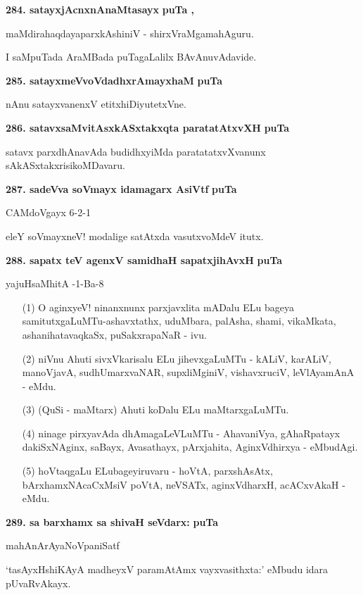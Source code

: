 \medskip
\noindent
\textbf{284. satayxjAcnxnAnaMtasayx} \hfill{\bf puTa \pageref{81}, \pageref{103}}

\hfill{maMdirahaqdayaparxkAshiniV - shirxVraMgamahAguru.}

\smallskip
I saMpuTada AraMBada puTagaLalilx BAvAnuvAdavide.

\medskip
\noindent
\textbf{285. satayxmeVvoVdadhxrAmayxhaM} \hfill{\bf puTa \pageref{92}}

\smallskip
nAnu satayxvanenxV etitxhiDiyutetxVne.

\medskip
\noindent
\textbf{286. satavxsaMvitAsxkASxtakxqta paratatAtxvXH} \hfill{\bf puTa \pageref{48}}

\smallskip
satavx parxdhAnavAda budidhxyiMda paratatatxvXvanunx sAkASxtakxrisikoMDavaru.

\medskip
\noindent
\textbf{287. sadeVva soVmayx idamagarx AsiVtf} \hfill{\bf puTa \pageref{74}}

\hfill{CAMdoVgayx 6-2-1}

\smallskip
eleY soVmayxneV! modalige satAtxda vasutxvoMdeV itutx.

\medskip
\noindent
\textbf{288. sapatx teV agenxV samidhaH sapatxjihAvxH} \hfill{\bf puTa \pageref{210}}

\hfill{yajuHsaMhitA -1-Ba-8}

\begin{itemize}
\item[(1)] O aginxyeV! ninanxnunx parxjavxlita mADalu ELu bageya samitutxgaLuMTu-\break ashavxtathx, uduMbara, palAsha, shami, vikaMkata, ashanihatavaqkaSx, puSakxrapaNaR - ivu.
\item[(2)] niVnu Ahuti sivxVkarisalu ELu jihevxgaLuMTu - kALiV, karALiV, manoVjavA, sudhUmarxvaNAR, supxliMginiV, vishavxruciV, leVlAyamAnA - eMdu.
\item[(3)] (QuSi - maMtarx) Ahuti koDalu ELu maMtarxgaLuMTu.
\item[(4)] ninage pirxyavAda dhAmagaLeVLuMTu - AhavaniVya, gAhaRpatayx dakiSxNAginx, saBayx, Avasathayx, pArx\-jahita, AginxVdhirxya - eMbudAgi.
\item[(5)] hoVtaqgaLu ELubageyiruvaru - hoVtA, parxshAsAtx, bArxhamxNAcaCxMsiV poVtA, neVSATx, aginxVdharxH, acACxvAkaH - eMdu.
\end{itemize}

\medskip
\noindent
\textbf{289. sa barxhamx sa shivaH seVdarx:} \hfill{\bf puTa \pageref{146}}

\hfill{mahAnArAyaNoVpaniSatf}

\smallskip
`tasAyxHshiKAyA madheyxV paramAtAmx vayxvasithxta:' eMbudu idara pUvaRvAkayx.

